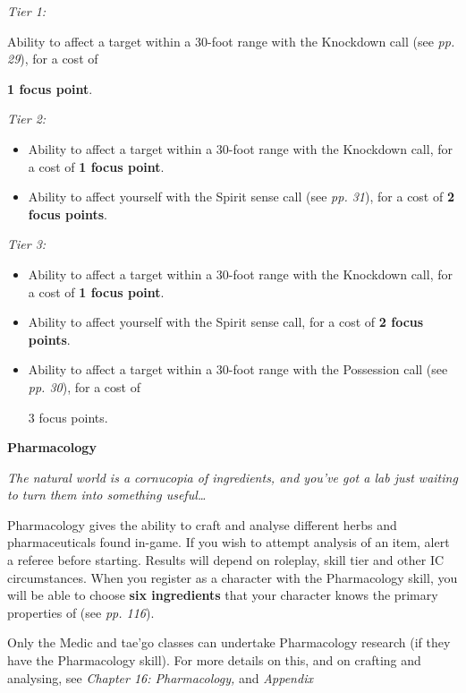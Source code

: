\documentclass{scrbook}
\begin{document}
\textit{Tier 1:}

Ability to affect a target within a 30-foot range with the Knockdown call (see \textit{pp. 29}), for a cost of

\textbf{1 focus point}.

\textit{Tier 2:}

\begin{itemize}
\item Ability to affect a target within a 30-foot range with the Knockdown call, for a cost of \textbf{1 focus point}.

\item Ability to affect yourself with the Spirit sense call (see \textit{pp. 31}), for a cost of \textbf{2 focus points}.

\end{itemize}
\textit{Tier 3:}

\begin{itemize}
\item Ability to affect a target within a 30-foot range with the Knockdown call, for a cost of \textbf{1 focus point}.

\item Ability to affect yourself with the Spirit sense call, for a cost of \textbf{2 focus points}.

\item Ability to affect a target within a 30-foot range with the Possession call (see \textit{pp. 30}), for a cost of

3 focus points.

\end{itemize}
\textbf{Pharmacology}

\textit{The natural world is a cornucopia of ingredients, and you've got a lab just waiting to turn them into something useful{\dots}}

Pharmacology gives the ability to craft and analyse different herbs and pharmaceuticals found in-game. If you wish to attempt analysis of an item, alert a referee before starting. Results will depend on roleplay, skill tier and other IC circumstances. When you register as a character with the Pharmacology skill, you will be able to choose \textbf{six ingredients} that your character knows the primary properties of (see \textit{pp. 116}).

Only the Medic and tae'go classes can undertake Pharmacology research (if they have the Pharmacology skill). For more details on this, and on crafting and analysing, see \textit{Chapter 16: Pharmacology}\textit{,} and \textit{Appendix}
\end{document}
